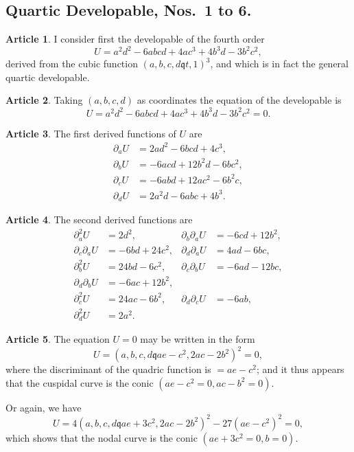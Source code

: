 \documentclass[11pt,a4paper]{article}
\theoremstyle{definition}
\newtheorem{art}{Article}[section]
\begin{document}
\subsection*{Quartic Developable, Nos.\ 1 to 6.}

\setcounter{art}{0}
\begin{art}
I consider first the developable of the fourth order
\[
U = a^2d^2 - 6abcd + 4ac^3 + 4b^3d - 3b^2c^2,
\]
derived from the cubic function $(a, b, c, d \mathbin{\mathfrak{q}} t, 1)^3$, and which is in fact the general
quartic developable.
\end{art}

\begin{art}
Taking $(a, b, c, d)$ as coordinates the equation of the developable is
\[
U = a^2d^2 - 6abcd + 4ac^3 + 4b^3d - 3b^2c^2 = 0.
\]
\end{art}

\begin{art}
The first derived functions of $U$ are
\begin{align*}
\partial_a U &= 2ad^2 - 6bcd + 4c^3, \\
\partial_b U &= -6acd + 12b^2d - 6bc^2, \\
\partial_c U &= -6abd + 12ac^2 - 6b^2c, \\
\partial_d U &= 2a^2d - 6abc + 4b^3.
\end{align*}
\end{art}

\begin{art}
The second derived functions are
\begin{align*}
\partial_a^2 U &= 2d^2, & \partial_b\partial_a U &= -6cd + 12b^2, \\
\partial_c\partial_a U &= -6bd + 24c^2, & \partial_d\partial_a U &= 4ad - 6bc, \\
\partial_b^2 U &= 24bd - 6c^2, & \partial_c\partial_b U &= -6ad - 12bc, \\
\partial_d\partial_b U &= -6ac + 12b^2, \\
\partial_c^2 U &= 24ac - 6b^2, & \partial_d\partial_c U &= -6ab, \\
\partial_d^2 U &= 2a^2.
\end{align*}
\end{art}

\begin{art}
The equation $U = 0$ may be written in the form
\[
U = (a, b, c, d \mathbin{\mathfrak{q}} ae - c^2, 2ac - 2b^2)^2 = 0,
\]
where the discriminant of the quadric function is $= ae - c^2$; and it thus appears that
the cuspidal curve is the conic $(ae - c^2 = 0, ac - b^2 = 0)$.

Or again, we have
\[
U = 4(a, b, c, d \mathbin{\mathfrak{q}} ae + 3c^2, 2ac - 2b^2)^2 - 27(ae - c^2)^2 = 0,
\]
which shows that the nodal curve is the conic $(ae + 3c^2 = 0, b = 0)$.
\end{art}
\end{document}
